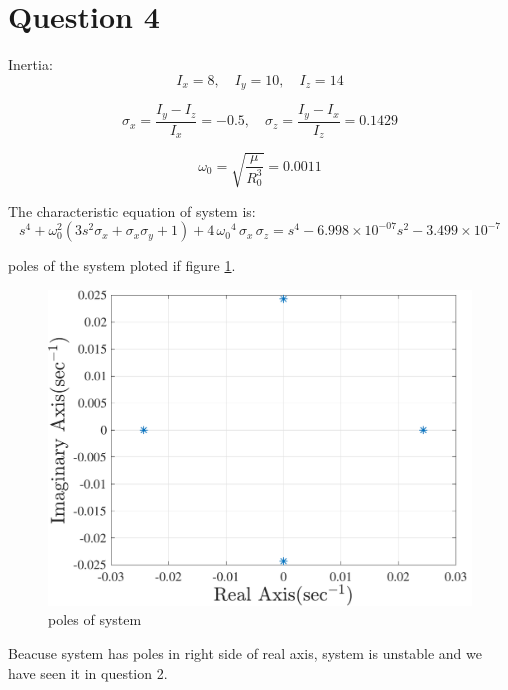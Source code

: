 \section{Question 4}
Inertia:
$$
I_x = 8, \quad I_y=10, \quad I_z = 14
$$

$$
\sigma_x = \dfrac{I_y-I_z}{I_x} = -0.5, \quad \sigma_z = \dfrac{I_y-I_x}{I_z} = 0.1429
$$

$$
\omega_0 = \sqrt{\dfrac{\mu}{R_0^3}} = 0.0011
$$

The characteristic equation of system is:
\begin{equation}
    s^4   + \omega_0^2(3s^2\sigma_x + \sigma_x\sigma_y + 1)  +4\,{\omega_0 }^4 \,\sigma_x \,\sigma_z = s^4 - 6.998\times10^{-07} s^2 - 3.499\times10^{-7}
\end{equation}

poles of the system ploted if figure \ref{poles}.

\begin{figure}[H]\label{poles}
    \caption{poles of system}
    \centering
    \includegraphics[width=12cm]{../Figure/Q4/pole_zero_map}
\end{figure}

Beacuse system has poles in right side of real axis, system is unstable and we have seen it in question 2.

